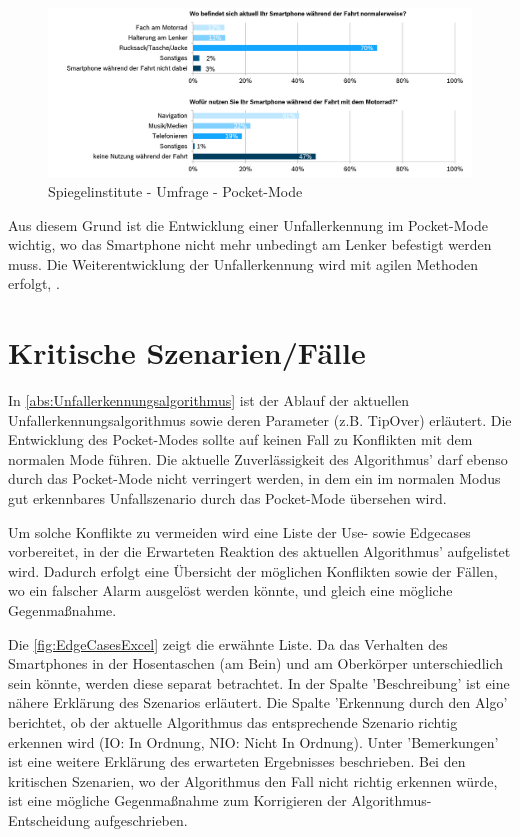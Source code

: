 \begin{figure}[H]
	\centering
	\includegraphics[width=\linewidth]{Bilder/SpiegelUmfragePocketMode.png}
	\caption{Spiegelinstitute - Umfrage - Pocket-Mode}
	\label{fig:CalimotoUmfragePocketMode}
\end{figure}

Aus diesem Grund ist die Entwicklung einer Unfallerkennung im Pocket-Mode wichtig, wo das Smartphone nicht mehr unbedingt am Lenker befestigt werden muss. Die Weiterentwicklung der Unfallerkennung wird mit agilen Methoden erfolgt, .

\section{Kritische Szenarien/Fälle}
In \autoref{abs:Unfallerkennungsalgorithmus} ist der Ablauf der aktuellen Unfallerkennungsalgorithmus sowie deren Parameter (z.B. TipOver) erläutert. Die Entwicklung des Pocket-Modes sollte auf keinen Fall zu Konflikten mit dem normalen Mode führen. Die aktuelle Zuverlässigkeit des Algorithmus' darf ebenso durch das Pocket-Mode nicht verringert werden, in dem ein im normalen Modus gut erkennbares Unfallszenario durch das Pocket-Mode übersehen wird.

Um solche Konflikte zu vermeiden wird eine Liste der Use- sowie Edgecases vorbereitet, in der die Erwarteten Reaktion des aktuellen Algorithmus' aufgelistet wird. Dadurch erfolgt eine Übersicht der möglichen Konflikten sowie der Fällen, wo ein falscher Alarm ausgelöst werden könnte, und gleich eine mögliche Gegenmaßnahme.

Die \autoref{fig:EdgeCasesExcel} zeigt die erwähnte Liste. Da das Verhalten des Smartphones in der Hosentaschen (am Bein) und am Oberkörper unterschiedlich sein könnte, werden diese separat betrachtet. In der Spalte 'Beschreibung' ist eine nähere Erklärung des Szenarios erläutert. Die Spalte 'Erkennung durch den Algo' berichtet, ob der aktuelle Algorithmus das entsprechende Szenario richtig erkennen wird (IO: In Ordnung, NIO: Nicht In Ordnung). Unter 'Bemerkungen' ist eine weitere Erklärung des erwarteten Ergebnisses beschrieben. Bei den kritischen Szenarien, wo der Algorithmus den Fall nicht richtig erkennen würde, ist eine mögliche Gegenmaßnahme zum Korrigieren der Algorithmus-Entscheidung aufgeschrieben.

